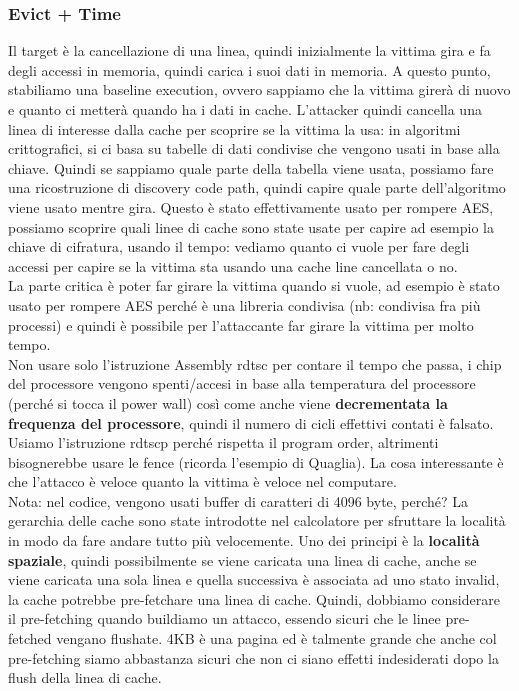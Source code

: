 \documentclass[12pt, oneside]{extbook} %
\begin{document}
\subsubsection{Evict + Time}
Il target è la cancellazione di una linea, quindi inizialmente la vittima gira e fa degli accessi in memoria, quindi carica i suoi dati in memoria. A questo punto, stabiliamo una baseline execution, ovvero sappiamo che la vittima girerà di nuovo e quanto ci metterà quando ha i dati in cache. L'attacker quindi cancella una linea di interesse dalla cache per scoprire se la vittima la usa: in algoritmi crittografici, si ci basa su tabelle di dati condivise che vengono usati in base alla chiave. Quindi se sappiamo quale parte della tabella viene usata, possiamo fare una ricostruzione di discovery code path, quindi capire quale parte dell'algoritmo viene usato mentre gira. Questo è stato effettivamente usato per rompere AES, possiamo scoprire quali linee di cache sono state usate per capire ad esempio la chiave di cifratura, usando il tempo: vediamo quanto ci vuole per fare degli accessi per capire se la vittima sta usando una cache line cancellata o no.\\ La parte critica è poter far girare la vittima quando si vuole, ad esempio è stato usato per rompere AES perché è una libreria condivisa (nb: condivisa fra più processi) e quindi è possibile per l'attaccante far girare la vittima per molto tempo.\\ Non usare solo l'istruzione Assembly \textsf{rdtsc} per contare il tempo che passa, i chip del processore vengono spenti/accesi in base alla temperatura del processore (perché si tocca il power wall) così come anche viene \textbf{decrementata la frequenza del processore}, quindi il numero di cicli effettivi contati è falsato. Usiamo l'istruzione \textsf{rdtscp} perché rispetta il program order, altrimenti bisognerebbe usare le fence (ricorda l'esempio di Quaglia). La cosa interessante è che l'attacco è veloce quanto la vittima è veloce nel computare.\\ Nota: nel codice, vengono usati buffer di caratteri di 4096 byte, perché? La gerarchia delle cache sono state introdotte nel calcolatore per sfruttare la località in modo da fare andare tutto più velocemente. Uno dei principi è la \textbf{località spaziale}, quindi possibilmente se viene caricata una linea di cache, anche se viene caricata una sola linea e quella successiva è associata ad uno stato invalid, la cache potrebbe pre-fetchare una linea di cache. Quindi, dobbiamo considerare il pre-fetching quando buildiamo un attacco, essendo sicuri che le linee pre-fetched vengano flushate. 4KB è una pagina ed è talmente grande che anche col pre-fetching siamo abbastanza sicuri che non ci siano effetti indesiderati dopo la flush della linea di cache.
\end{document}

